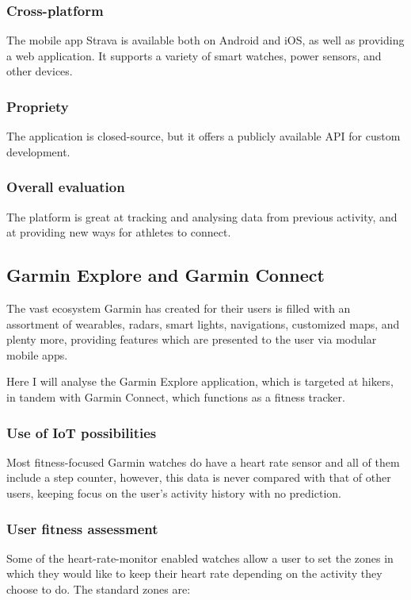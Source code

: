 \subsubsection*{Cross-platform}
The mobile app Strava is available both on Android and iOS, as well as providing a web application.
It supports a variety of smart watches, power sensors, and other devices.
\subsubsection*{Propriety}
The application is closed-source, but it offers a publicly available API for custom development.
\subsubsection*{Overall evaluation}
The platform is great at tracking and analysing data from previous activity, and at providing new ways for athletes to connect.
\subsection{Garmin Explore and Garmin Connect}
The vast ecosystem Garmin has created for their users is filled with an assortment of wearables, radars, smart lights, navigations, customized maps, and plenty more, providing features which are presented to the user via modular mobile apps.

Here I will analyse the Garmin Explore application, which is targeted at hikers, in tandem with Garmin Connect, which functions as a fitness tracker.

\subsubsection*{Use of IoT possibilities}
Most fitness-focused Garmin watches do have a heart rate sensor and all of them include a step counter, however, this data is never compared with that of other users, keeping focus on the user's activity history with no prediction.
\subsubsection*{User fitness assessment}
Some of the heart-rate-monitor enabled watches allow a user to set the zones in which they would like to keep their heart rate depending on the activity they choose to do. The standard zones are:


